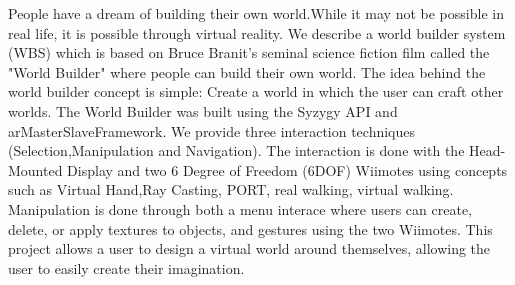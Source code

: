 People have a dream of building their own world.While it may not be possible in real life, it is possible through virtual reality.
We describe a world builder system (WBS) which is based on Bruce Branit’s seminal science fiction film called the "World Builder" where people can build their own world.
The idea behind the world builder concept is simple: Create a world in which the user can craft other worlds.
The World Builder was built using the Syzygy API and arMasterSlaveFramework.
We provide three interaction techniques (Selection,Manipulation and Navigation).
The interaction is done with the Head-Mounted Display and two 6 Degree of Freedom (6DOF) Wiimotes using concepts such as Virtual Hand,Ray Casting, PORT, real walking, virtual walking.
Manipulation is done through both a menu interace where users can create, delete, or apply textures to objects, and gestures using the two Wiimotes.
This project allows a user to design a virtual world around themselves, allowing the user to easily create their imagination.
